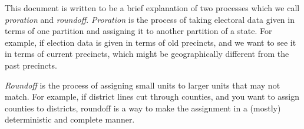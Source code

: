 This document is written to be a brief explanation of two 
processes which we call {\it proration} and 
{\it roundoff}. 
{\it Proration} is the process of taking electoral data given in 
terms of one partition and assigning it to another partition of a 
state. For example, if election data is given in 
terms of old precincts, and we want to see it in terms of 
current precincts, which might be geographically different 
from the past precincts.
\newline
~\begin{center}
\end{center}
{\it Roundoff} is the process of assigning small units to larger 
units that may not match. For example, if district lines cut 
through counties, and you want to assign counties to 
districts, roundoff is a way to make the assignment in a 
(mostly) deterministic and complete manner.
